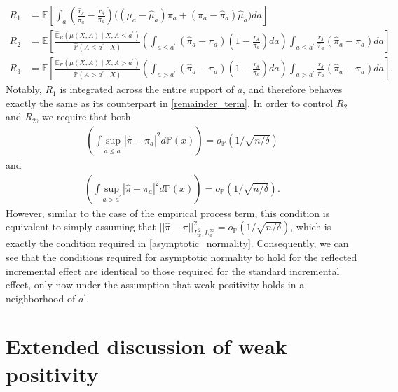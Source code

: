 \documentclass[11pt,twoside]{article}
\theoremstyle{definition}
\theoremstyle{remark}
\begin{document}
\begin{align*}
     R_1 &= \mathbb{E} \left[ \int_{a}\left(\frac{\widehat{r}_\delta}{\widehat{\pi}_a} - \frac{r_\delta}{\pi_a} \right)\Big( (\mu_a - \widehat{\mu}_a)\pi_a + (\pi_a - \widehat{\pi}_a) \widehat{\mu}_a \Big) da \right] \\
    R_2 &= \mathbb{E}\left[\frac{\widehat{\mathbb{E}}_R\left(\mu(X, A) \mid X, A \leq a^{\prime} \right)}{\widehat{\mathbb{P}}(A \leq a^{\prime} \mid X)}\left( \int_{a \leq a^{\prime}} (\widehat{\pi}_a - \pi_a)\left( 1 - \frac{r_\delta}{\pi_a} \right)  da \right)\int_{a \leq a^{\prime}} \frac{\widehat{r}_\delta}{\widehat{\pi}_a} (\widehat{\pi}_a - \pi_a) da \right] \\
    R_3 &= \mathbb{E}\left[ \frac{\widehat{\mathbb{E}}_R\left(\mu(X, A) \mid X, A > a^{\prime} \right)}{\widehat{\mathbb{P}}(A > a^{\prime} \mid X)}\left( \int_{a > a^{\prime}} (\widehat{\pi}_a - \pi_a)\left( 1 - \frac{r_\delta}{\pi_a} \right)  da \right)\int_{a > a^{\prime}} \frac{\widehat{r}_\delta}{\widehat{\pi}_a} (\widehat{\pi}_a - \pi_a) da\right].
 \end{align*}
Notably, $R_1$ is integrated across the entire support of $a$, and therefore behaves exactly the same as its counterpart in \cref{remainder_term}. In order to control $R_2$ and $R_2$, we require that both
\begin{align*}
     \left( \int \underset{a \leq a^\prime}{\text{sup}} \, | \widehat{\pi} - \pi_a|^2 d\mathbb{P}(x) \right) = o_{\mathbb{P}}\left(1 / \sqrt{n / \delta}\right)
\end{align*}
and 
\begin{align*}
    \left( \int \underset{a > a^\prime}{\text{sup}} \, | \widehat{\pi} - \pi_a|^2 d\mathbb{P}(x) \right) = o_{\mathbb{P}}\left(1 / \sqrt{n / \delta}\right).
\end{align*}
However, similar to the case of the empirical process term, this condition is equivalent to simply assuming that $|| \widehat{\pi} - \pi||^2_{L^2_x, L^\infty_a} = o_{\mathbb{P}}(1 / \sqrt{n / \delta})$, which is exactly the condition required in \cref{asymptotic_normality}. Consequently, we can see that the conditions required for asymptotic normality to hold for the reflected incremental effect are identical to those required for the standard incremental effect, only now under the assumption that weak positivity holds in a neighborhood of $a^\prime$.


\section{Extended discussion of weak positivity} \label{weak_positivity_section}
\end{document}
